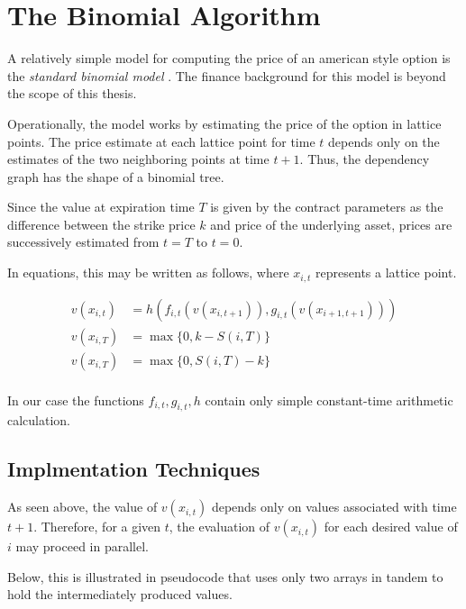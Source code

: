 \section{The Binomial Algorithm}

A relatively simple model for computing the price of an american style option
is the \emph{standard binomial model} . The finance background for this model is beyond the
scope of this thesis.

Operationally, the model works by estimating the price of the option in lattice
points. The price estimate at each lattice point for time $t$ depends only on
the estimates of the two neighboring points at time $t+1$. Thus, the dependency
graph has the shape of a binomial tree. 


Since the value at expiration time $T$ is given by the contract parameters as
the difference between the strike price $k$ and price of the underlying asset,
prices are successively estimated from $t=T$ to $t=0$.


In equations, this may be written as follows, where $x_{i,t}$ represents a
lattice point.

\begin{align*}
v(x_{i,t}) &= h(f_{i,t}(v(x_{i,t+1})),g_{i,t}(v(x_{i+1,t+1}))) \\
v(x_{i,T}) &= \max\{ 0, k - S(i,T) \} \tag{for a put-option}\\
v(x_{i,T}) &= \max\{ 0, S(i,T) - k \} \tag{for a call-option}\\
\end{align*}

In our case the functions $f_{i,t},g_{i,t},h$ contain only simple constant-time
arithmetic calculation.

\subsection{Implmentation Techniques}

As seen above, the value of $v(x_{i,t})$ depends only on values
associated with time $t+1$. Therefore, for a given $t$, the evaluation of
$v(x_{i,t})$ for each desired value of $i$ may proceed in parallel.

Below, this is illustrated in pseudocode that uses only two arrays in tandem
to hold the intermediately produced values.

